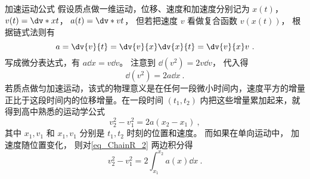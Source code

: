 \begin{example}{加速运动公式}\label{ex_ChainR_3}
假设质点做一维运动，位移、速度和加速度分别记为 $x(t)$，  $v(t) = \dv*{x}{t}$，  $a(t) = \dv*{v}{t}$， 但若把速度 $v$ 看做复合函数 $v(x(t))$， 根据链式法则有
\begin{equation}
a = \dv{v}{t} = \dv{v}{x}\dv{x}{t} = \dv{v}{x}v~.
\end{equation}
写成微分表达式，有 $a\dd{x} = v\dd{v}$。 注意到 $\dd (v^2) = 2v\dd{v}$， 代入得
\begin{equation}\label{eq_ChainR_2}
\dd(v^2) = 2a \dd{x}~.
\end{equation}
若质点做匀加速运动，该式的物理意义是在任何一段微小时间内，速度平方的增量正比于这段时间内的位移增量。在一段时间 $(t_1,t_2)$ 内把这些增量累加起来，就得到高中熟悉的运动学公式
\begin{equation}
v_2^2-v_1^2 = 2a(x_2-x_1)~,
\end{equation}
其中 $x_1,v_1$ 和 $x_1,v_1$ 分别是 $t_1,t_2$ 时刻的位置和速度。 而如果在单向运动中， 加速度随位置变化， 则对\autoref{eq_ChainR_2} 两边积分得
\begin{equation}
v_2^2 - v_1^2 = 2\int_{x_1}^{x_2}a(x)\dd{x}~.
\end{equation}
\end{example}

